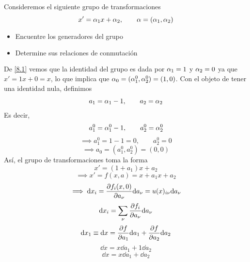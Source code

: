 \begin{ej}
	Consideremos el siguiente grupo de transformaciones 
	\begin{equation}\label{8.1}
  x'=\alpha_1x+\alpha_2,\qquad \alpha=(\alpha_1,\alpha_2)
\end{equation}
\begin{itemize}
	\item Encuentre los generadores del grupo
	\item Determine sus relaciones de conmutación
\end{itemize}
\end{ej}

\begin{sol}
	De \eqref{8.1} vemos que la identidad del grupo es dada por $\alpha_1=1$ y $\alpha_2=0$ ya que $x'=1x+0=x$, lo que implica que $\alpha_0=(\alpha_1^0,\alpha_2^0)=(1,0)$. Con el objeto de tener una identidad nula, definimos
	\begin{equation}
  a_1=\alpha_1-1,\qquad a_2=\alpha_2
\end{equation}
Es decir,
\begin{equation}
  a_1^0=\alpha_1^0-1,\qquad a_2^0=\alpha_2^0
\end{equation}
\begin{equation}
	\implies a_1^0=1-1=0,\qquad a_2^0=0
\end{equation}
\begin{equation}
  \implies a_0=(a_1^0,a_2^0)=(0,0)
\end{equation}
Así, el grupo de transformaciones toma la forma
\begin{equation}
  x'=(1+a_1)x+a_2
\end{equation}
\begin{equation}
  \implies\boxed{ x'=f(x,a)=x+a_1 x+a_2}
\end{equation}
\begin{equation}
  \implies \dd x_i=\pdv{f_i(x,0)}{a_\nu}\dd a_\nu =u(x)_{i\nu} \dd a_\nu 
\end{equation}
\begin{equation}
  \dd x_i=\sum_\nu \pdv{f_i}{a_\nu}\dd a_\nu 
\end{equation}
\begin{equation}
  \dd x_1\equiv \dd x=\pdv{f}{a_1}\dd a_1+\pdv{f}{a_2}\dd a_2
\end{equation}
\begin{equation}
  \dd x=x\dd a_1+1\dd a_2
\end{equation}
\begin{equation}
  \boxed{\dd x=x\dd a_1+\dd a_2}
\end{equation}

\end{sol}
